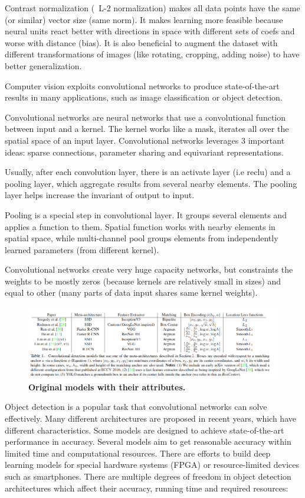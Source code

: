 \documentclass[conference]{IEEEtran}
\begin{document}
Contrast normalization (~L-2 normalization) makes all data points have the same (or similar) vector size (same norm). It makes learning more feasible because neural units react better with directions in space with different sets of coefs and worse with distance (bias). It is also beneficial to augment the dataset with different transformations of images (like rotating, cropping, adding noise) to have better generalization.

Computer vision exploits convolutional networks to produce state-of-the-art results in many applications, such as image classification or object detection.

Convolutional networks are neural networks that use a convolutional function between input and a kernel. The kernel works like a mask, iterates all over the spatial space of an input layer. Convolutional networks leverages 3 important ideas: sparse connections, parameter sharing and equivariant representations.

Usually, after each convolution layer, there is an activate layer (i.e reclu) and a pooling layer, which aggregate results from several nearby elements. The pooling layer helps increase the invariant of output to input.

Pooling is a special step in convolutional layer. It groups several elements and applies a function to them. Spatial function works with nearby elements in spatial space, while multi-channel pool groups elements from independently learned parameters (from different kernel).

Convolutional networks create very huge capacity networks, but constraints the weights to be mostly zeros (because kernels are relatively small in sizes) and equal to other (many parts of data input shares same kernel weights).

\begin{figure}[htpb]
	  \centering
	  \includegraphics[width=\textwidth]{original_models}
	  \caption{\textbf{Original models with their attributes.}}
	  \label{fig:original_models}
\end{figure}

Object detection is a popular task that convolutional networks can solve effectively. Many different architectures are proposed in recent years, which have different characteristics. Some models are designed to achieve state-of-the-art performance in accuracy. Several models aim to get reasonable accuracy within limited time and computational resources. There are efforts to build deep learning models for special hardware systems (FPGA) or resource-limited devices such as smartphones. There are multiple degrees of freedom in object detection architectures which affect their accuracy, running time and required resources:
\end{document}
